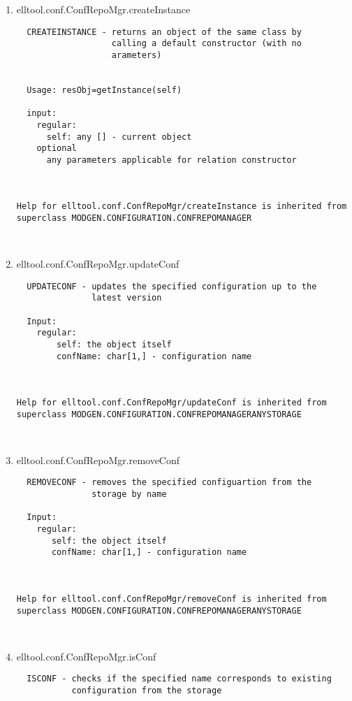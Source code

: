 \begin{enumerate}
\begin{lstlisting}
\end{lstlisting}
\fontfamily{\familydefault}
\selectfont
\item {elltool.conf.ConfRepoMgr.createInstance}
\selectfont
\begin{lstlisting}
  CREATEINSTANCE - returns an object of the same class by
                   calling a default constructor (with no
                   arameters)


  Usage: resObj=getInstance(self)

  input:
    regular:
      self: any [] - current object
    optional
      any parameters applicable for relation constructor



Help for elltool.conf.ConfRepoMgr/createInstance is inherited from superclass MODGEN.CONFIGURATION.CONFREPOMANAGER



\end{lstlisting}
\fontfamily{\familydefault}
\selectfont
\item {elltool.conf.ConfRepoMgr.updateConf}
\selectfont
\begin{lstlisting}
  UPDATECONF - updates the specified configuration up to the
               latest version

  Input:
    regular:
        self: the object itself
        confName: char[1,] - configuration name



Help for elltool.conf.ConfRepoMgr/updateConf is inherited from superclass MODGEN.CONFIGURATION.CONFREPOMANAGERANYSTORAGE



\end{lstlisting}
\fontfamily{\familydefault}
\selectfont
\item {elltool.conf.ConfRepoMgr.removeConf}
\selectfont
\begin{lstlisting}
  REMOVECONF - removes the specified configuartion from the
               storage by name

  Input:
    regular:
       self: the object itself
       confName: char[1,] - configuration name



Help for elltool.conf.ConfRepoMgr/removeConf is inherited from superclass MODGEN.CONFIGURATION.CONFREPOMANAGERANYSTORAGE



\end{lstlisting}
\fontfamily{\familydefault}
\selectfont
\item {elltool.conf.ConfRepoMgr.isConf}
\selectfont
\begin{lstlisting}
  ISCONF - checks if the specified name corresponds to existing
           configuration from the storage


\end{lstlisting}
\end{enumerate}
